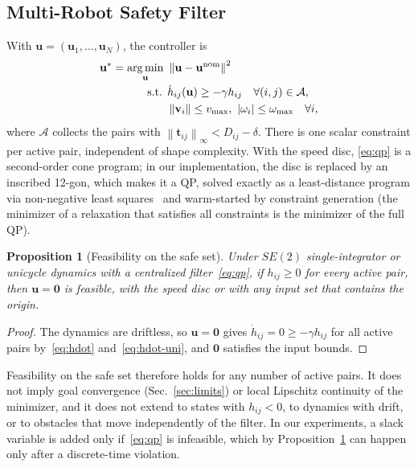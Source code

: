 \documentclass[journal]{IEEEtran}
\newtheorem{proposition}{Proposition}
\theoremstyle{definition}
\newcommand{\norm}[1]{\left\lVert #1\right\rVert}
\DeclareMathOperator*{\argmin}{arg\,min}
\begin{document}
\subsection{Multi-Robot Safety Filter}
With $\mathbf u=(\mathbf u_1,\dots,\mathbf u_N)$, the controller is
\begin{equation}\label{eq:qp}
\begin{aligned}
\mathbf u^\ast=\argmin_{\mathbf u}\ &\norm{\mathbf u-\mathbf u^{\rm nom}}^2\\
\text{s.t. }&\dot h_{ij}(\mathbf u)\ge-\gamma h_{ij}\quad\forall (i,j)\in\mathcal A,\\
&\norm{\mathbf v_i}\le v_{\max},\ |\omega_i|\le\omega_{\max}\quad\forall i,
\end{aligned}
\end{equation}
where $\mathcal A$ collects the pairs with $\norm{\mathbf t_{ij}}_\infty<D_{ij}-\delta$. There is one
scalar constraint per active pair, independent of shape complexity. With the speed disc,
\eqref{eq:qp} is a second-order cone program; in our implementation, the disc is replaced by an
inscribed 12-gon, which makes it a QP, solved exactly as a least-distance program via non-negative
least squares~\cite{lawson1995solving} and warm-started by constraint generation (the minimizer of a
relaxation that satisfies all constraints is the minimizer of the full QP).

\begin{proposition}[Feasibility on the safe set]\label{prop:feas}
Under $SE(2)$ single-integrator or unicycle dynamics with a centralized filter~\eqref{eq:qp}, if
$h_{ij}\ge0$ for every active pair, then $\mathbf u=\mathbf 0$ is feasible, with the speed disc or
with any input set that contains the origin.
\end{proposition}
\begin{proof}
The dynamics are driftless, so $\mathbf u=\mathbf 0$ gives $\dot h_{ij}=0\ge-\gamma h_{ij}$ for
all active pairs by~\eqref{eq:hdot} and~\eqref{eq:hdot-uni}, and $\mathbf 0$ satisfies the input
bounds.
\end{proof}
Feasibility on the safe set therefore holds for any number of active pairs. It does not imply goal
convergence (Sec.~\ref{sec:limits}) or local Lipschitz continuity of the minimizer, and it does not
extend to states with $h_{ij}<0$, to dynamics with drift, or to obstacles that move independently of
the filter. In our experiments, a slack variable is added only if~\eqref{eq:qp} is infeasible, which
by Proposition~\ref{prop:feas} can happen only after a discrete-time violation.
\end{document}

